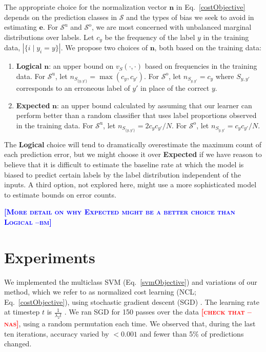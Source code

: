 \documentclass{article} %
\newcommand{\unorderedS}{\mathcal{S}^{\mathrm{u}}}
\newcommand{\orderedS}{\mathcal{S}^{\mathrm{o}}}
\newcommand{\ourmethod}{NCL}
\newcommand{\bmcomment}[1]{\textcolor{blue}{\textsc{\textbf{[#1 --bm]}}}}
\newcommand{\nascomment}[1]{\textcolor{red}{\textsc{\textbf{[#1 --nas]}}}}
\begin{document}
The appropriate choice for the normalization vector $\mathbf{n}$ in 
Eq.~\ref{costObjective} depends on the prediction classes in
$\mathcal{S}$ and the types of bias we seek to avoid in estimating $\mathbf{e}$.
For $\unorderedS$ and $\orderedS$, we are most concerned with
unbalanced marginal distributions over labels.  
Let $c_y$ be the frequency of the label $y$ in the training data,
$|\{i \mid y_i = y\}|$.
We propose two choices
of $\mathbf{n}$, both based on the training data:
\begin{enumerate}
\item \textbf{Logical} $\mathbf{n}$:  an upper bound on $v_S(\cdot,
  \cdot)$ based on frequencies in the training data.  For $\unorderedS$, let
  $n_{S_{\{y,y'\}}} = \max(c_y, c_{y'})$.  For
  $\orderedS$, let $n_{S_{y, y'}} = c_y$ where
  $S_{y,y'}$ corresponds to an erroneous label of $y'$ in place of the
  correct $y$.
\item \textbf{Expected} $\mathbf{n}$:  an upper bound calculated by
  assuming that our learner can perform better than a random
  classifier that uses label proportions observed in the training
  data.    For $\unorderedS$, let $n_{S_{\{y,y'\}}} = 2c_y c_{y'} / N$.  For
  $\orderedS$, let $n_{S_{y,y'}} =  c_y c_{y'} / N$. 
\end{enumerate}

 The \textbf{Logical} choice
will tend to dramatically overestimate the maximum count of each
prediction error,
but we might choose it over \textbf{Expected} if we have reason
to believe that it is difficult to estimate the baseline rate at
which the model is biased to predict certain labels by the label
distribution independent of the inputs.
A third option, not explored here, might use a more sophisticated
model to estimate bounds on error counts.

\bmcomment{More detail on why Expected might be a better 
choice than Logical}

\section{Experiments}

We implemented the multiclass SVM (Eq.~\ref{svmObjective}) and
variations of our method, which we refer to as
normalized cost learning (\ourmethod{}; Eq.~\ref{costObjective}), using
stochastic  gradient descent (SGD) \citep{yin2003stochastic}.
The learning rate at timestep $t$ is $\frac{1}{\lambda_2 t}$
\citep{shalev2011pegasos}.
We ran SGD for 150 passes over the data \nascomment{check that}, using a
random permutation each time.  We observed that, during the last ten
iterations, accuracy varied by $<
0.001$ and fewer than 5\% of predictions changed.
\end{document}
